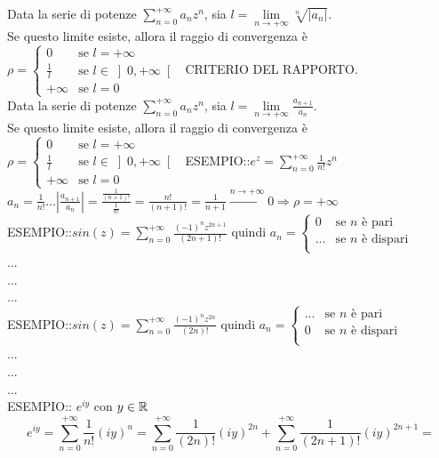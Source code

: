 Data la serie di potenze $\sum\limits_{n=0}^{+\infty}a_nz^n$, sia $l=\lim\limits_{n\to+\infty}\sqrt[n]{\left|a_n\right|}$.\\
Se questo limite esiste, allora il raggio di convergenza è 
$\rho =
	\begin{cases}
		0				&	\text{se }l=+\infty\\
		\frac{1}{l} 	&	\text{se }l\in\left]0,+\infty\right[\\
		+\infty 		& 	\text{se }l=0
	\end{cases}
$
\proposition CRITERIO DEL RAPPORTO.\\
Data la serie di potenze $\sum\limits_{n=0}^{+\infty}a_nz^n$, sia $l=\lim\limits_{n\to+\infty}\frac{a_{n+1}}{a_n}$.\\
Se questo limite esiste, allora il raggio di convergenza è 
$\rho =
\begin{cases}
0				&	\text{se }l=+\infty\\
\frac{1}{l} 	&	\text{se }l\in\left]0,+\infty\right[\\
+\infty 		& 	\text{se }l=0
\end{cases}
$
ESEMPIO::$e^z=\sum\limits_{n=0}^{+\infty}\frac{1}{n!}z^n$\\
$a_n=\frac{1}{n!} ...  \left|\frac{a_{n+1}}{a_n} \right|=\frac{\frac{1}{(n+1)!}}{\frac{1}{n!}}=\frac{n!}{(n+1)!}=\frac{1}{n+1}\overset{n\to+\infty}{\to}0 \Rightarrow \rho=+\infty$\\
ESEMPIO::$sin(z)=\sum\limits_{n=0}^{+\infty}\frac{(-1)^nz^{2n+1}}{(2n+1)!}$ quindi 
$a_n =
\begin{cases}
0		&	\text{se }n\text{ è pari}\\
...		&	\text{se }n\text{ è dispari}\\
\end{cases}
$\\
...\\
...\\
...\\
ESEMPIO::$sin(z)=\sum\limits_{n=0}^{+\infty}\frac{(-1)^nz^{2n}}{(2n)!}$ quindi 
$a_n =
\begin{cases}
...		&	\text{se }n\text{ è pari}\\
0		&	\text{se }n\text{ è dispari}\\
\end{cases}
$\\
...\\
...\\
...\\
ESEMPIO:: $e^{iy}$ con $y\in \mathbb{R}$ 
$$e^{iy} = \sum\limits_{n=0}^{+\infty}\frac{1}{n!}(iy)^n = \sum\limits_{n=0}^{+\infty}\frac{1}{(2n)!}(iy)^{2n} + \sum\limits_{n=0}^{+\infty}\frac{1}{(2n+1)!}(iy)^{2n+1} = $$
